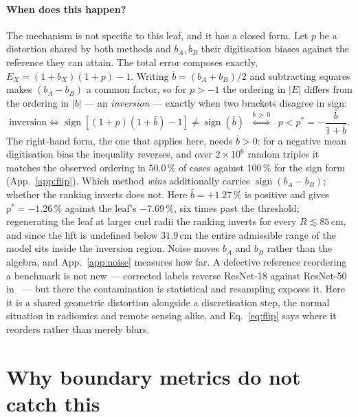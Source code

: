 \documentclass{article}
\newcommand{\pct}[1]{$#1\,\%$}
\begin{document}
\paragraph{When does this happen?} The mechanism is not specific to this leaf, and it has a
closed form. Let $p$ be a distortion shared by both methods and $b_A, b_B$ their digitisation
biases against the reference they can attain. The total error composes exactly,
$E_X = (1+b_X)(1+p) - 1$. Writing $\bar b = (b_A+b_B)/2$ and subtracting squares makes
$(b_A-b_B)$ a common factor, so for $p > -1$ the ordering in $|E|$ differs from the ordering in
$|b|$ --- an \emph{inversion} --- exactly when two brackets disagree in sign:
\begin{equation}
  \text{inversion} \iff
  \operatorname{sign}\!\left[(1+p)(1+\bar b) - 1\right] \neq \operatorname{sign}(\bar b)
  \;\;\overset{\bar b\,>\,0}{\Longleftrightarrow}\;\;
  p < p^{*} = -\frac{\bar b}{1+\bar b}.
  \label{eq:flip}
\end{equation}
The right-hand form, the one that applies here, needs $\bar b > 0$: for a negative mean
digitisation bias the inequality reverses, and over $2\times10^6$ random triples it matches the
observed ordering in \pct{50.0} of cases against \pct{100} for the sign form
(App.~\ref{app:flip}). Which method \emph{wins} additionally carries
$\operatorname{sign}(b_A-b_B)$; whether the ranking inverts does not. Here $\bar b = +1.27\,\%$ is
positive and gives $p^{*} = -1.26\,\%$ against the leaf's
\pct{-7.69}, six times past the threshold; regenerating the leaf at larger curl radii the ranking
inverts for every $R \lesssim 85$\,cm, and since the lift is undefined below $31.9$\,cm the entire
admissible range of the model sits inside the inversion region. Noise moves $b_A$ and $b_B$ rather
than the algebra, and App.~\ref{app:noise} measures how far. A defective reference reordering a
benchmark is not new --- corrected labels reverse ResNet-18 against ResNet-50
in~\citet{northcutt2021} --- but there the contamination is statistical and resampling exposes it.
Here it is a shared geometric distortion alongside a discretisation step, the normal situation in
radiomics and remote sensing alike, and Eq.~\eqref{eq:flip} says where it reorders rather than
merely blurs.

\section{Why boundary metrics do not catch this}
\end{document}
